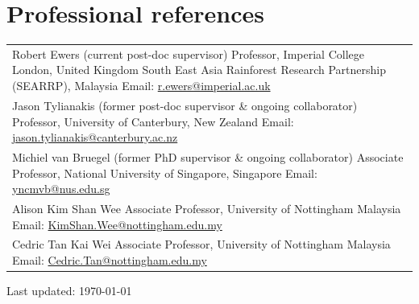 \documentclass[a4paper]{article}
\def\footerlink{}
\begin{document}
\section*{Professional references}
\begin{tabular}{p{\linewidth}}

Robert Ewers (current post-doc supervisor) \newline
Professor, Imperial College London, United Kingdom \newline 
South East Asia Rainforest Research Partnership (SEARRP), Malaysia \newline
Email: \url{r.ewers@imperial.ac.uk} \\

Jason Tylianakis (former post-doc supervisor \& ongoing collaborator) \newline
Professor, University of Canterbury, New Zealand \newline 
Email: \url{jason.tylianakis@canterbury.ac.nz} \\

Michiel van Bruegel (former PhD supervisor \& ongoing collaborator) \newline 
Associate Professor, National University of Singapore, Singapore \newline 
Email: \url{yncmvb@nus.edu.sg} \\

Alison Kim Shan Wee \newline
Associate Professor, University of Nottingham Malaysia \newline 
Email: \url{KimShan.Wee@nottingham.edu.my} \\

Cedric Tan Kai Wei \newline
Associate Professor, University of Nottingham Malaysia \newline 
Email: \url{Cedric.Tan@nottingham.edu.my} \\
\end{tabular}

\vfill
\begin{center}
  \begin{footnotesize}
    Last updated: \today \\
    \href{\footerlink}{\texttt{\footerlink}}
  \end{footnotesize}
\end{center}
\end{document}
